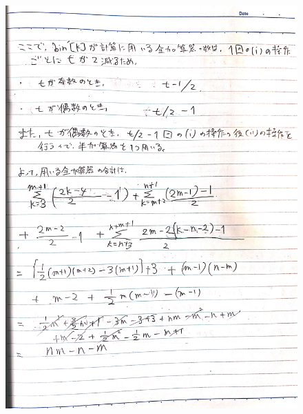 \documentclass[dvipdfmx,a4paper,12pt]{jsarticle}
\begin{document}
\begin{figure}[htbp]
  \centering
  \includegraphics[width=130mm]{images/IMG_7424.JPG}
\end{figure}
\end{document}
